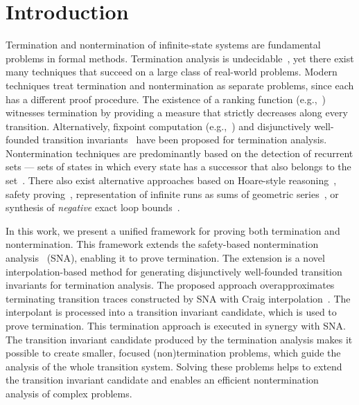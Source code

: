 \section{Introduction}
\label{Sec:Introduction}

Termination and nontermination of infinite-state systems are fundamental problems in formal methods. 
Termination analysis is undecidable~\cite{DBLP:journals/x/Turing37}, 
yet there exist many techniques that succeed on a large class of real-world problems.
Modern techniques treat termination and nontermination as separate 
problems, since each has a different proof procedure.
The existence of a ranking function (e.g.,~\cite{DBLP:conf/vmcai/PodelskiR04,DBLP:conf/cav/KuraUH20,DBLP:journals/jacm/Ben-AmramG14,DBLP:conf/cav/HeizmannHP14,DBLP:journals/jar/GieslABEFFHOPSS17,DBLP:conf/esop/SaritaSGSV26,DBLP:conf/sas/Ben-AmramDG19,DBLP:conf/tacas/UrbanGK16,FedyukovichZG18,RileyF25})
witnesses termination by providing a measure that strictly decreases along every transition.
Alternatively, fixpoint computation (e.g.,~\cite{DBLP:journals/pacmpl/UnnoTGK23}) and disjunctively well-founded 
transition invariants~\cite{Transition-Invariants-Revisited-CAV26,DBLP:conf/pldi/CookPR06,DBLP:conf/cav/KroeningSTW10,DBLP:conf/tacas/TsitovichSWK11} have been proposed for termination analysis.
Nontermination techniques are predominantly based on the detection of recurrent 
sets — sets of states in which every state has a successor that also belongs to the set~\cite{DBLP:conf/sas/Ben-AmramDG19,DBLP:conf/cade/FrohnG22,DBLP:conf/tacas/BrockschmidtCIK16,DBLP:conf/foveoos/BrockschmidtSOG11,DBLP:conf/cav/LarrazNORR14,FedyukovichZG18}.
There also exist alternative approaches based on Hoare-style reasoning~\cite{DBLP:conf/pldi/LeQC15}, 
safety proving~\cite{DBLP:conf/tacas/ChenCFNO14,DBLP:journals/entcs/BiereAS02,DBLP:journals/entcs/SchuppanB06}, representation of infinite
runs as sums of geometric series~\cite{DBLP:conf/tacas/LeikeH18},
or synthesis of \emph{negative} exact loop bounds~\cite{RileyF25}.


In this work, we present a unified framework for proving both termination and nontermination.
This framework extends the safety-based nontermination 
analysis~\cite{DBLP:conf/tacas/ChenCFNO14} (SNA), enabling it to prove termination.
The extension is a novel interpolation-based method for generating
disjunctively well-founded transition invariants for termination analysis.
The proposed approach overapproximates terminating transition traces constructed by SNA with
Craig interpolation~\cite{Craig_1957}.
The interpolant is processed into a transition invariant candidate, which is used to prove termination.
This termination approach is executed in synergy with SNA.
The transition invariant candidate produced by the termination analysis makes it possible to create smaller,
focused (non)termination problems, which guide the analysis of the whole transition system.
Solving these problems helps to extend the transition invariant candidate and
enables an efficient nontermination analysis of complex problems.

